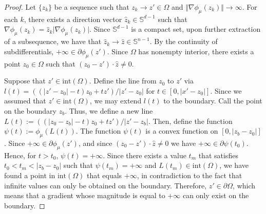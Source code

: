 \documentclass{amsart}
\theoremstyle{lemma}
\theoremstyle{remark}
\begin{document}
\begin{proof}
Let $\{z_k \}$ be a sequence such that $z_k \rightarrow z' \in \Omega$ and $\Vert \nabla \phi_{\mu}(z_k) \Vert \rightarrow \infty$. For each $k$, there exists a direction vector $\hat{z}_k \in \mathbb{S}^{d-1}$ such that $\nabla \phi_{\mu}(z_k) = \hat{z}_k \vert \nabla \phi_{\mu}(z_k) \vert$. Since $\mathbb{S}^{d-1}$ is a compact set, upon further extraction of a subsequence, we have that $\hat{z}_{k} \rightarrow \hat{z} \in \mathbb{S}^{n-1}$. By the continuity of subdifferentials, $+ \infty \in \partial \phi_{\mu}(z')$. Since $\Omega$ has nonempty interior, there exists a point $z_0 \in \Omega$ such that $(z_0 - z')\cdot \hat{z} \neq 0$.

Suppose that $z' \in \text{int}(\Omega)$. Define the line from $z_0$ to $z'$ via $l(t) = ((\vert z' - z_0 \vert -t)z_0 + tz') /\vert z' - z_0 \vert$ for $t \in [0,\vert x' - z_0 \vert]$. Since we assumed that $z' \in \text{int}(\Omega)$, we may extend $l(t)$ to the boundary. Call the point on the boundary $z_b$. Thus, we define a new line $L(t) := ((\vert z_0 - z_b \vert -t)z_0 + tz') /\vert z' - z_b \vert$. Then, define the function $\psi(t) := \phi_{\mu}(L(t))$. The function $\psi(t)$ is a convex function on $[0, \vert z_b - z_0 \vert]$. Since $+ \infty \in \partial \phi_{\mu}(z')$, and since $(z_0 - z')\cdot \hat{z} \neq 0$ we have $+ \infty \in \partial \psi(t_0)$. Hence, for $t >t_0$, $\psi(t)  = +\infty$. Since there exists a value $t_m$ that satisfies $t_0 < t_m < \vert z_b - z_0 \vert$ such that $\psi(t_m) = +\infty$ and $L(t_m) \in \text{int}(\Omega)$, we have found a point in $\text{int}(\Omega)$ that equals $+\infty$, in contradiction to the fact that infinite values can only be obtained on the boundary. Therefore, $z' \in \partial \Omega$, which means that a gradient whose magnitude is equal to $+\infty$ can only exist on the boundary.
\end{proof}
\end{document}
